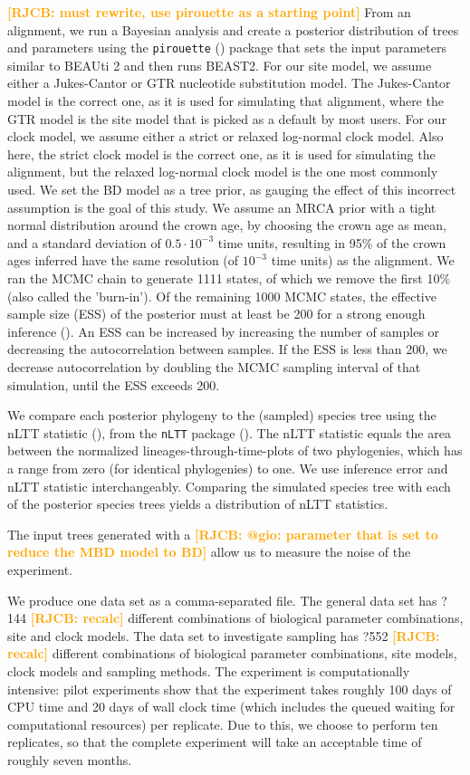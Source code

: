 \documentclass{article}
\newcommand*\richel[1]{\textcolor{orange}{\textbf{[RJCB: #1]}}}
\begin{document}
\richel{must rewrite, use pirouette as a starting point}
From an alignment, we run a Bayesian analysis and 
create a posterior distribution of trees and parameters
using the \verb;pirouette; (\cite{pirouette}) package
that sets the input parameters similar to BEAUti 2 and then runs BEAST2. 
For our site model, we assume either a Jukes-Cantor or GTR nucleotide substitution model.
The Jukes-Cantor model is the correct one, as it is used for simulating that alignment,
where the GTR model is the site model that is picked as a default by most users.
For our clock model, we assume either a strict or relaxed log-normal 
clock model. 
Also here, the strict clock model is the correct one, as it is used for simulating the alignment,
but the relaxed log-normal clock model is the one most commonly used.
We set the BD model as a tree prior, 
as gauging the effect of this incorrect assumption is the goal of this study. 
We assume an MRCA prior with a tight normal distribution
around the crown age, by choosing the crown age as mean, and a standard deviation 
of $0.5 \cdot 10^{-3}$ time units,
resulting in 95\% of the crown ages inferred have the same resolution (of $10^{-3}$ time 
units) as the alignment. 
We ran the MCMC chain to generate 1111 states,
of which we remove the first 10\% (also called the 'burn-in'). 
Of the remaining
1000 MCMC states, the effective sample size (ESS) of the posterior 
must at least be 200
for a strong enough inference (\cite{beastbook}). An ESS can be increased by increasing
the number of samples or decreasing the autocorrelation between samples. 
If the ESS is less than 200, we decrease autocorrelation by doubling 
the MCMC sampling interval of that simulation, until the ESS exceeds 200.

We compare each posterior phylogeny to the (sampled) species tree
using the nLTT statistic (\cite{janzen2015}), from the \verb;nLTT; package (\cite{nltt}). 
The nLTT statistic equals the area between the normalized
lineages-through-time-plots of two phylogenies, which has a range 
from zero (for identical phylogenies) to one. We use inference error 
and nLTT statistic interchangeably. Comparing the simulated species tree
with each of the posterior species trees yields a distribution of nLTT statistics. 

The input trees generated with a \richel{@gio: parameter that is set to reduce the MBD model to BD} 
allow us to measure the noise of the experiment.

We produce one data set as a comma-separated file.
The general data set has ?144 \richel{recalc} different combinations
of biological parameter combinations, site and clock models.
The data set to investigate sampling has ?552 \richel{recalc} different combinations
of biological parameter combinations, site models, clock models 
and sampling methods. The experiment is computationally intensive:
pilot experiments show that the experiment takes roughly 100 days
of CPU time and 20 days of wall clock time (which includes the queued 
waiting for computational resources) per replicate. 
Due to this, we choose to perform ten replicates, so that the complete
experiment will take an acceptable time of roughly seven months. 
\end{document}
